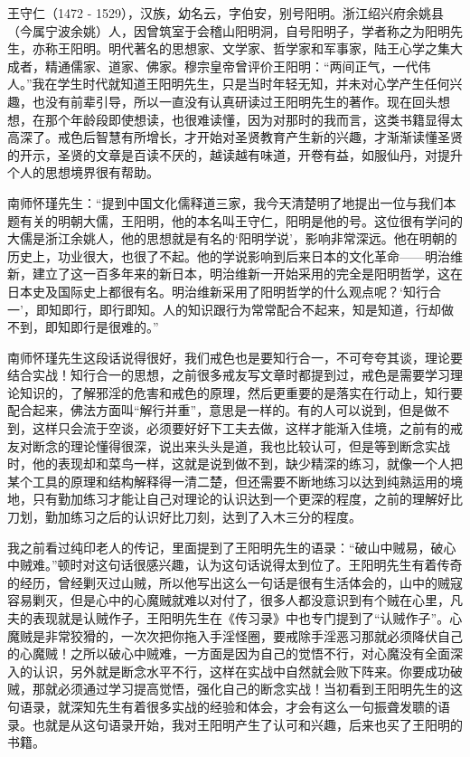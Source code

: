 王守仁（1472 - 1529），汉族，幼名云，字伯安，别号阳明。浙江绍兴府余姚县（今属宁波余姚）人，因曾筑室于会稽山阳明洞，自号阳明子，学者称之为阳明先生，亦称王阳明。明代著名的思想家、文学家、哲学家和军事家，陆王心学之集大成者，精通儒家、道家、佛家。穆宗皇帝曾评价王阳明：“两间正气，一代伟人。”我在学生时代就知道王阳明先生，只是当时年轻无知，并未对心学产生任何兴趣，也没有前辈引导，所以一直没有认真研读过王阳明先生的著作。现在回头想想，在那个年龄段即使想读，也很难读懂，因为对那时的我而言，这类书籍显得太高深了。戒色后智慧有所增长，才开始对圣贤教育产生新的兴趣，才渐渐读懂圣贤的开示，圣贤的文章是百读不厌的，越读越有味道，开卷有益，如服仙丹，对提升个人的思想境界很有帮助。

南师怀瑾先生：“提到中国文化儒释道三家，我今天清楚明了地提出一位与我们本题有关的明朝大儒，王阳明，他的本名叫王守仁，阳明是他的号。这位很有学问的大儒是浙江余姚人，他的思想就是有名的‘阳明学说’，影响非常深远。他在明朝的历史上，功业很大，也很了不起。他的学说影响到后来日本的文化革命——明治维新，建立了这一百多年来的新日本，明治维新一开始采用的完全是阳明哲学，这在日本史及国际史上都很有名。明治维新采用了阳明哲学的什么观点呢？‘知行合一’，即知即行，即行即知。人的知识跟行为常常配合不起来，知是知道，行却做不到，即知即行是很难的。”

南师怀瑾先生这段话说得很好，我们戒色也是要知行合一，不可夸夸其谈，理论要结合实战！知行合一的思想，之前很多戒友写文章时都提到过，戒色是需要学习理论知识的，了解邪淫的危害和戒色的原理，然后更重要的是落实在行动上，知行要配合起来，佛法方面叫“解行并重”，意思是一样的。有的人可以说到，但是做不到，这样只会流于空谈，必须要好好下工夫去做，这样才能渐入佳境，之前有的戒友对断念的理论懂得很深，说出来头头是道，我也比较认可，但是等到断念实战时，他的表现却和菜鸟一样，这就是说到做不到，缺少精深的练习，就像一个人把某个工具的原理和结构解释得一清二楚，但还需要不断地练习以达到纯熟运用的境地，只有勤加练习才能让自己对理论的认识达到一个更深的程度，之前的理解好比刀划，勤加练习之后的认识好比刀刻，达到了入木三分的程度。

我之前看过纯印老人的传记，里面提到了王阳明先生的语录：“破山中贼易，破心中贼难。”顿时对这句话很感兴趣，认为这句话说得太到位了。王阳明先生有着传奇的经历，曾经剿灭过山贼，所以他写出这么一句话是很有生活体会的，山中的贼寇容易剿灭，但是心中的心魔贼就难以对付了，很多人都没意识到有个贼在心里，凡夫的表现就是认贼作子，王阳明先生在《传习录》中也专门提到了“认贼作子”。心魔贼是非常狡猾的，一次次把你拖入手淫怪圈，要戒除手淫恶习那就必须降伏自己的心魔贼！之所以破心中贼难，一方面是因为自己的觉悟不行，对心魔没有全面深入的认识，另外就是断念水平不行，这样在实战中自然就会败下阵来。你要成功破贼，那就必须通过学习提高觉悟，强化自己的断念实战！当初看到王阳明先生的这句语录，就深知先生有着很多实战的经验和体会，才会有这么一句振聋发聩的语录。也就是从这句语录开始，我对王阳明产生了认可和兴趣，后来也买了王阳明的书籍。

